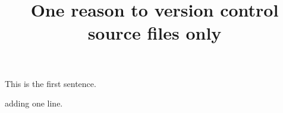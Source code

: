 \documentclass{article}
\title{One reason to version control source files only}
\begin{document}
\maketitle

This is the first sentence.

adding one line.
\end{document}

